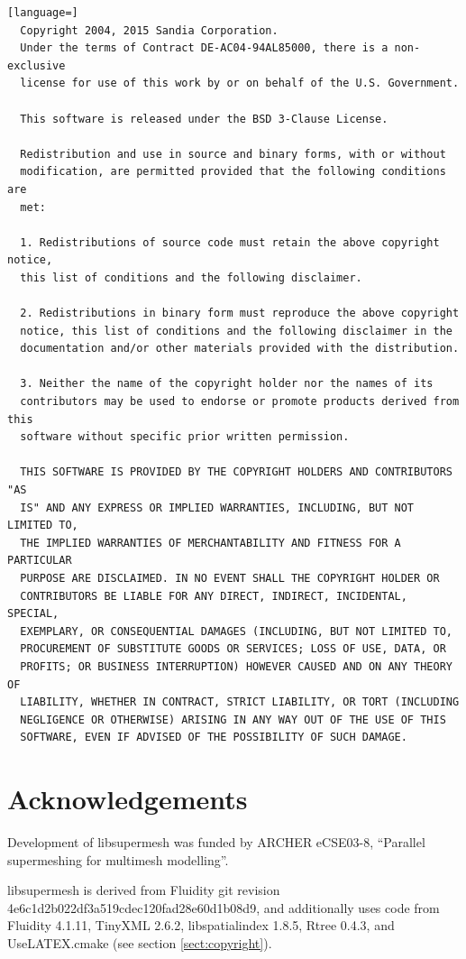 \documentclass{article}
\begin{document}
\begin{lstlisting}[language=] 
  Copyright 2004, 2015 Sandia Corporation.
  Under the terms of Contract DE-AC04-94AL85000, there is a non-exclusive
  license for use of this work by or on behalf of the U.S. Government.
 
  This software is released under the BSD 3-Clause License.
 
  Redistribution and use in source and binary forms, with or without
  modification, are permitted provided that the following conditions are
  met:
 
  1. Redistributions of source code must retain the above copyright notice,
  this list of conditions and the following disclaimer.
 
  2. Redistributions in binary form must reproduce the above copyright
  notice, this list of conditions and the following disclaimer in the
  documentation and/or other materials provided with the distribution.
 
  3. Neither the name of the copyright holder nor the names of its
  contributors may be used to endorse or promote products derived from this
  software without specific prior written permission.
 
  THIS SOFTWARE IS PROVIDED BY THE COPYRIGHT HOLDERS AND CONTRIBUTORS "AS
  IS" AND ANY EXPRESS OR IMPLIED WARRANTIES, INCLUDING, BUT NOT LIMITED TO,
  THE IMPLIED WARRANTIES OF MERCHANTABILITY AND FITNESS FOR A PARTICULAR
  PURPOSE ARE DISCLAIMED. IN NO EVENT SHALL THE COPYRIGHT HOLDER OR
  CONTRIBUTORS BE LIABLE FOR ANY DIRECT, INDIRECT, INCIDENTAL, SPECIAL,
  EXEMPLARY, OR CONSEQUENTIAL DAMAGES (INCLUDING, BUT NOT LIMITED TO,
  PROCUREMENT OF SUBSTITUTE GOODS OR SERVICES; LOSS OF USE, DATA, OR
  PROFITS; OR BUSINESS INTERRUPTION) HOWEVER CAUSED AND ON ANY THEORY OF
  LIABILITY, WHETHER IN CONTRACT, STRICT LIABILITY, OR TORT (INCLUDING
  NEGLIGENCE OR OTHERWISE) ARISING IN ANY WAY OUT OF THE USE OF THIS
  SOFTWARE, EVEN IF ADVISED OF THE POSSIBILITY OF SUCH DAMAGE.
\end{lstlisting}

\section{Acknowledgements}

Development of libsupermesh was funded by ARCHER eCSE03-8, ``Parallel
supermeshing for multimesh modelling''.

libsupermesh is derived from Fluidity git revision
4e6c1d2b022df3a519cdec120fad28e60d1b08d9, and additionally uses code from
Fluidity 4.1.11, TinyXML 2.6.2, libspatialindex 1.8.5, Rtree 0.4.3, and
UseLATEX.cmake (see section \ref{sect:copyright}).
\end{document}
